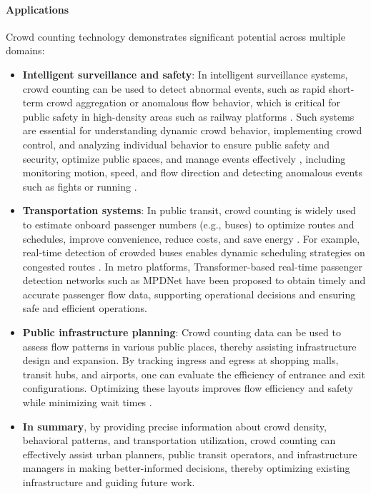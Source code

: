 \paragraph{Applications} Crowd counting technology demonstrates significant potential across multiple domains:
\begin{itemize}
  \item \textbf{Intelligent surveillance and safety}: In intelligent surveillance systems, crowd counting can be used to detect abnormal events, such as rapid short-term crowd aggregation or anomalous flow behavior, which is critical for public safety in high-density areas such as railway platforms \cite{01_noauthor_deep_2024}. Such systems are essential for understanding dynamic crowd behavior, implementing crowd control, and analyzing individual behavior to ensure public safety and security, optimize public spaces, and manage events effectively \cite{15_ganga_object_2024}, including monitoring motion, speed, and flow direction and detecting anomalous events such as fights or running \cite{03_abdou_crowd_2020}.
  \item \textbf{Transportation systems}: In public transit, crowd counting is widely used to estimate onboard passenger numbers (e.g., buses) to optimize routes and schedules, improve convenience, reduce costs, and save energy \cite{33or34_li_lightweight_2023}. For example, real-time detection of crowded buses enables dynamic scheduling strategies on congested routes \cite{55_tsiktsiris_improving_2024}. In metro platforms, Transformer-based real-time passenger detection networks such as MPDNet \cite{64_yang_mpdnet_2022} have been proposed to obtain timely and accurate passenger flow data, supporting operational decisions and ensuring safe and efficient operations.
  \item \textbf{Public infrastructure planning}: Crowd counting data can be used to assess flow patterns in various public places, thereby assisting infrastructure design and expansion. By tracking ingress and egress at shopping malls, transit hubs, and airports, one can evaluate the efficiency of entrance and exit configurations. Optimizing these layouts improves flow efficiency and safety while minimizing wait times \cite{17_gupta_crowd_2024}.
  \item \textbf{In summary}, by providing precise information about crowd density, behavioral patterns, and transportation utilization, crowd counting can effectively assist urban planners, public transit operators, and infrastructure managers in making better-informed decisions, thereby optimizing existing infrastructure and guiding future work.
\end{itemize}

